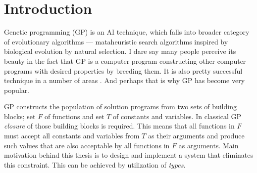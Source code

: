 \documentclass[12pt,a4paper]{report}
\begin{document}
\newpage



\pagestyle{plain}
\setcounter{page}{1}


\tableofcontents	
	
\chapter*{Introduction}



Genetic programming (GP) is an AI technique, which falls into broader category 
of evolutionary algorithms  ---  mataheuristic  search algorithms inspired  by 
biological evolution by natural selection. I dare say many people perceive its beauty in the  fact that GP is a computer program  constructing other computer programs %
with desired properties by breeding them. 
It is also pretty successful technique in a number of areas \cite{koza05}. 
And perhaps that is why GP has become very popular.    

GP constructs the population of solution programs from 
two sets of building blocks; set $F$ of functions 
and set $T$ of constants and variables. 
In classical GP \textit{closure} of those 
building blocks is required.
This means that all functions in $F$ must accept all 
constants and variables from $T$ as their arguments and produce 
such values that are also acceptable by all functions in $F$ as arguments.
Main motivation behind this thesis is to design and implement a system that
eliminates this constraint. 
This can be achieved by utilization of \textit{types}.\\
\end{document}

